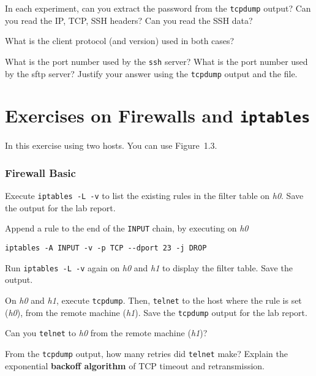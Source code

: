\documentclass{../UTNetLab}
\begin{document}
    \begin{report}
        \item In each experiment, can you extract the password from the \lstinline{tcpdump} output?
            Can you read the IP, TCP, SSH headers?
            Can you read the SSH data?
        
        \item What is the client protocol (and version) used in both cases?
        
        \item What is the port number used by the \lstinline{ssh} server?
            What is the port number used by the sftp server?
            Justify your answer using the \lstinline{tcpdump} output and the  file.
    \end{report}

\part{Exercises on Firewalls and \texttt{iptables}}
    In this exercise using two hosts.
    You can use Figure~1.3.

\section{Firewall Basic}
    Execute \lstinline{iptables -L -v} to list the existing rules in the filter table on \textit{h0}.
    Save the output for the lab report.

    Append a rule to the end of the \texttt{INPUT} chain, by executing on \textit{h0}
    \begin{lstlisting}[morekeywords={[3]INPUT,TCP,DROP}]
iptables -A INPUT -v -p TCP --dport 23 -j DROP
    \end{lstlisting}
    
    Run \lstinline{iptables -L -v} again on \textit{h0} and \textit{h1} to display the filter table.
    Save the output.

    On \textit{h0} and \textit{h1}, execute \lstinline{tcpdump}.
    Then, \lstinline{telnet} to the host where the rule is set (\textit{h0}), from the remote machine (\textit{h1}).
    Save the \lstinline{tcpdump} output for the lab report.

    \begin{report}
        \item Can you \lstinline{telnet} to \textit{h0} from the remote machine (\textit{h1})?
        
        \item From the \lstinline{tcpdump} output, how many retries did \lstinline{telnet} make? Explain the exponential \textbf{backoff algorithm} of TCP timeout and retransmission.
    \end{report}
    
\end{document}
